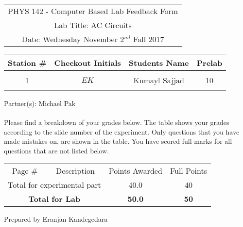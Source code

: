 \documentclass{article}
\begin{document}

\begin{table}[h]
	\centering
	\begin{tabular}{c}
	PHYS 142 - Computer Based Lab Feedback Form\\
	Lab Title: AC Circuits\\Date: Wednesday November 2$^{nd}$ Fall 2017 \\\hline
\end{tabular}
\end{table}
\begin{table}[h]\centering \begin{tabular}{|c|c|p{9.9 cm}|c|}\hline Station \#  & Checkout Initials & \multicolumn{1}{|c|}{Students Name} & Prelab \\\hline\multirow{3}{*}{1}& \multirow{3}{*}{$EK$} & &\\& &\multicolumn{1}{|c|}{Kumayl Sajjad}&10\\&   &  &\\\hline
\end{tabular}
\end{table}
Partner(s): Michael Pak\\
\\Please find a breakdown of your grades below. The table shows your grades according to the slide number of the experiment. Only questions that you have made mistakes on, are shown in the table. You have scored full marks for all questions that are not listed below.

\begin{table}[h!] \centering \label{my-label} \begin{tabular}{|c|p{11.75 cm}|c|c|}\hline
\multirow{2}{1cm}{Page \#}& \multicolumn{1}{|c|}{\multirow{2}{*}{Description}}  & \multirow{2}{1.5 cm}{Points Awarded} & \multirow{2}{1 cm}{Full Points} \\   &  &  &\\\hline
\multicolumn{2}{|c|}{\multirow{1}{*}{Total for experimental part}} &40.0& 40 \\\hline\multicolumn{2}{|c|}{\multirow{2}{*}{\textbf{Total for Lab}}} &\multirow{2}{*}{\textbf{50.0}}& \multirow{2}{*}{\textbf{50}} \\ \multicolumn{2}{|c|}{}&&\\ \hline\hline\end{tabular}
 \end{table}
\clearpage
\null\vfill \begin{center}Prepared by Eranjan Kandegedara\end{center}  \clearpage
\end{document}
